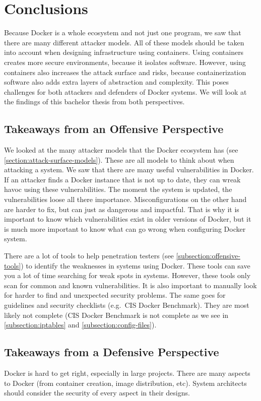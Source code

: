 \chapter{Conclusions}
Because Docker is a whole ecosystem and not just one program, we saw that there are many different attacker models. All of these models should be taken into account when designing infrastructure using containers. Using containers creates more secure environments, because it isolates software. However, using containers also increases the attack surface and risks, because containerization software also adds extra layers of abstraction and complexity. This poses challenges for both attackers and defenders of Docker systems. We will look at the findings of this bachelor thesis from both perspectives.

\section{Takeaways from an Offensive Perspective}
We looked at the many attacker models that the Docker ecosystem has (see \autoref{section:attack-surface-models}). These are all models to think about when attacking a system. We saw that there are many useful vulnerabilities in Docker. If an attacker finds a Docker instance that is not up to date, they can wreak havoc using these vulnerabilities. The moment the system is updated, the vulnerabilities loose all there importance. Misconfigurations on the other hand are harder to fix, but can just as dangerous and impactful. That is why it is important to know which vulnerabilities exist in older versions of Docker, but it is much more important to know what can go wrong when configuring Docker system.

\medskip

There are a lot of tools to help penetration testers (see \autoref{subsection:offensive-tools}) to identify the weaknesses in systems using Docker. These tools can save you a lot of time searching for weak spots in systems. However, these tools only scan for common and known vulnerabilities. It is also important to manually look for harder to find and unexpected security problems.
The same goes for guidelines and security checklists (e.g.\ CIS Docker Benchmark). They are most likely not complete (CIS Docker Benchmark is not complete as we see in \autoref{subsection:iptables} and \autoref{subsection:config-files}).

\section{Takeaways from a Defensive Perspective}
Docker is hard to get right, especially in large projects. There are many aspects to Docker (from container creation, image distribution, etc). System architects should consider the security of every aspect in their designs.

